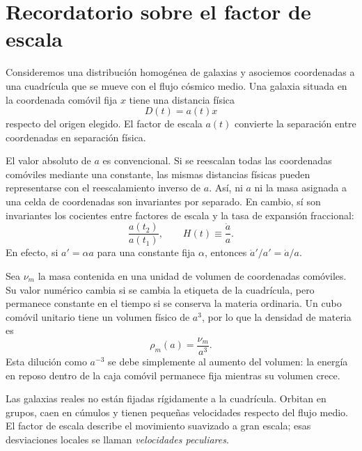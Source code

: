 \section{Recordatorio sobre el factor de escala}

Consideremos una distribución homogénea de galaxias y asociemos coordenadas a una cuadrícula que se mueve con el flujo cósmico medio. Una galaxia situada en la coordenada comóvil fija \(x\) tiene una distancia física
\begin{equation}
D(t)=a(t)x
\label{eq:c02-distance}
\end{equation}
respecto del origen elegido. El factor de escala \(a(t)\) convierte la separación entre coordenadas en separación física.

El valor absoluto de \(a\) es convencional. Si se reescalan todas las coordenadas comóviles mediante una constante, las mismas distancias físicas pueden representarse con el reescalamiento inverso de \(a\). Así, ni \(a\) ni la masa asignada a una celda de coordenadas son invariantes por separado. En cambio, sí son invariantes los cocientes entre factores de escala y la tasa de expansión fraccional:
\begin{equation}
\frac{a(t_2)}{a(t_1)},
\qquad
H(t)\equiv\frac{\dot a}{a}.
\label{eq:c02-hubble}
\end{equation}
En efecto, si \(a'=\alpha a\) para una constante fija \(\alpha\), entonces \(\dot a'/a'=\dot a/a\).

Sea \(\nu_m\) la masa contenida en una unidad de volumen de coordenadas comóviles. Su valor numérico cambia si se cambia la etiqueta de la cuadrícula, pero permanece constante en el tiempo si se conserva la materia ordinaria. Un cubo comóvil unitario tiene un volumen físico de \(a^3\), por lo que la densidad de materia es
\begin{equation}
\boxed{\rho_m(a)=\frac{\nu_m}{a^3}.}
\label{eq:c02-matter-density}
\end{equation}
Esta dilución como \(a^{-3}\) se debe simplemente al aumento del volumen: la energía en reposo dentro de la caja comóvil permanece fija mientras su volumen crece.

Las galaxias reales no están fijadas rígidamente a la cuadrícula. Orbitan en grupos, caen en cúmulos y tienen pequeñas velocidades respecto del flujo medio. El factor de escala describe el movimiento suavizado a gran escala; esas desviaciones locales se llaman \emph{velocidades peculiares}.

\begin{classroomqa}
\end{classroomqa}

